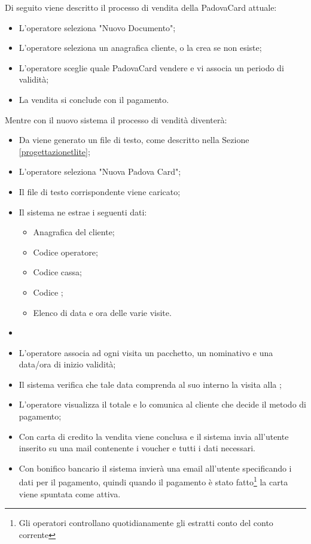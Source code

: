 Di seguito viene descritto il processo di vendita della PadovaCard attuale:
\begin{itemize}
\item L'operatore seleziona "Nuovo Documento";
\item L'operatore seleziona un anagrafica cliente, o la crea se non esiste;
\item L'operatore sceglie quale PadovaCard vendere e vi associa un periodo di validità;
\item La vendita si conclude con il pagamento.
\end{itemize}
Mentre con il nuovo sistema il processo di vendità diventerà:
\begin{itemize}
\item Da \tlite viene generato un file di testo, come descritto nella Sezione \ref{progettazionetlite};
\item L'operatore seleziona "Nuova Padova Card";
\item Il file di testo \tlite corrispondente viene caricato;
\item Il sistema ne estrae i seguenti dati:
	\begin{itemize}
		\item Anagrafica del cliente;
        \item Codice operatore;
        \item Codice cassa;
        \item Codice \tlite;
        \item Elenco di data e ora delle varie visite.
	\end{itemize}
\item 
\item L'operatore associa ad ogni visita un pacchetto, un nominativo e una data/ora di inizio validità;
\item Il sistema verifica che tale data comprenda al suo interno la visita alla \cappella;
\item L'operatore visualizza il totale e lo comunica al cliente che decide il metodo di pagamento;
\item Con carta di credito la vendita viene conclusa e il sistema invia all'utente inserito su \tlite una mail contenente i voucher e tutti i dati necessari.
\item Con bonifico bancario il sistema invierà una email all'utente specificando i dati per il pagamento, quindi quando il pagamento è stato fatto\footnote{Gli operatori controllano quotidianamente gli estratti conto del conto corrente} la carta viene spuntata come attiva.
\end{itemize}

